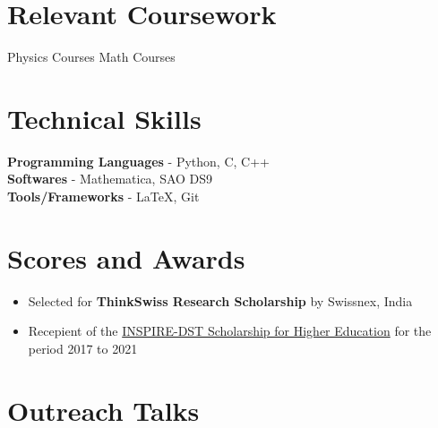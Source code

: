 \documentclass[margin, centered]{res}
\begin{document}
\begin{resume}





\section{Relevant Coursework}
Physics Courses
Math Courses\\


\section{Technical \hspace{2mm} Skills}
\textbf{Programming Languages} - Python, C, C++\\
\textbf{Softwares} - Mathematica, SAO DS9 \\
\textbf{Tools/Frameworks} - \LaTeX, Git


\section{Scores and Awards}
\begin{itemize}[leftmargin=*]

 \item Selected for \textbf{ThinkSwiss Research Scholarship} by Swissnex, India

 \item Recepient of the \href{http://www.inspire-dst.gov.in/scholarship.html}{INSPIRE-DST Scholarship for Higher Education} for the period 2017 to 2021
\end{itemize}

\section{Outreach Talks}



\end{resume}
\end{document}
